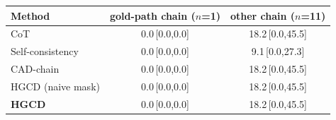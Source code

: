 \begin{tabular}{lcc}
\toprule
Method & gold-path chain ($n$=1) & other chain ($n$=11) \\
\midrule
CoT & 0.0\,{\scriptsize[0.0,0.0]} & 18.2\,{\scriptsize[0.0,45.5]} \\
Self-consistency & 0.0\,{\scriptsize[0.0,0.0]} & 9.1\,{\scriptsize[0.0,27.3]} \\
CAD-chain & 0.0\,{\scriptsize[0.0,0.0]} & 18.2\,{\scriptsize[0.0,45.5]} \\
HGCD (naive mask) & 0.0\,{\scriptsize[0.0,0.0]} & 18.2\,{\scriptsize[0.0,45.5]} \\
\textbf{HGCD} & 0.0\,{\scriptsize[0.0,0.0]} & 18.2\,{\scriptsize[0.0,45.5]} \\
\bottomrule
\end{tabular}
